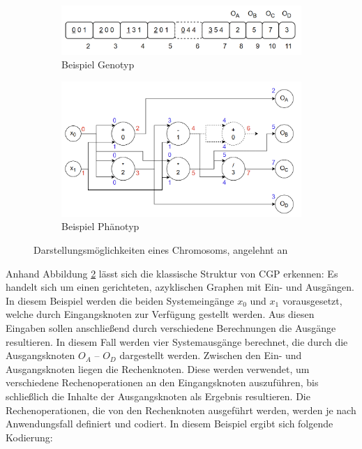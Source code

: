\begin{figure}[H]
	\centering
	\begin{subfigure}[b]{\textwidth}
		\centering
		\includegraphics[scale = 0.45]{Bilder/TorabiBeispielGenotypNeu.png}
		\caption{Beispiel Genotyp}
		\label{fig:genotypNeu}
	\end{subfigure}
	
	\hfill
    
    \begin{subfigure}[b]{\textwidth}
    	\centering
    	\includegraphics[scale = 0.45]{Bilder/BeispielChromosom.png}
    	\caption{Beispiel Phänotyp}
    	\label{fig:phänotyp}
    \end{subfigure}
    \caption{Darstellungsmöglichkeiten eines Chromosoms, angelehnt an \cite{torabi_using_2022}}
    \label{fig:genoPhänoGesamt}
\end{figure}


Anhand Abbildung \ref{fig:phänotyp} lässt sich die klassische Struktur von CGP erkennen:
Es handelt sich um einen gerichteten, azyklischen Graphen mit Ein- und Ausgängen.
In diesem Beispiel werden die beiden Systemeingänge $x_0$ und $x_1$ vorausgesetzt, welche durch Eingangsknoten zur Verfügung gestellt werden.
Aus diesen Eingaben sollen anschließend durch verschiedene Berechnungen die Ausgänge resultieren.
In diesem Fall werden vier Systemausgänge berechnet, die durch die Ausgangsknoten $O_A$ – $O_D$ dargestellt werden.
Zwischen den Ein- und Ausgangsknoten liegen die Rechenknoten.
Diese werden verwendet, um verschiedene Rechenoperationen an den Eingangsknoten auszuführen, bis schließlich die Inhalte der Ausgangsknoten als Ergebnis resultieren.
Die Rechenoperationen, die von den Rechenknoten ausgeführt werden, werden je nach Anwendungsfall definiert und codiert.
In diesem Beispiel ergibt sich folgende Kodierung:

